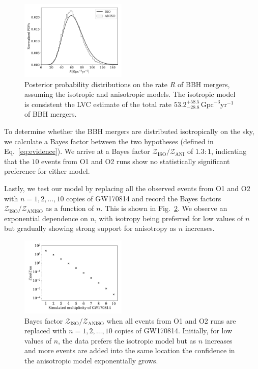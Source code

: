 \documentclass[usenatbib,useAMS]{mnras}
\begin{document}
\begin{figure}
	\centering
	\includegraphics[width=0.45\textwidth]{./figures/rates_histogram.pdf}
    \caption{Posterior probability distributions on the rate $R$ of \ac{BBH} mergers,
	assuming the isotropic and anisotropic models. The isotropic model is
	consistent the LVC estimate of the total rate
	$53.2^{+58.5}_{-28.8}\,\mathrm{Gpc}^{-3}\mathrm{yr}^{-1}$ of \ac{BBH} mergers.}
	\label{fig:totalRateHist}
\end{figure}

To determine whether the \ac{BBH} mergers are distributed
isotropically on the sky, we calculate a Bayes factor between the two
hypotheses (defined in Eq.~\ref{eq:evidence}). We arrive at a Bayes factor
$\mathcal{Z}_{\mathrm{ISO}} / \mathcal{Z}_{\mathrm{ANI}}$ of $1.3:1$, indicating
that the $10$ events from O1 and O2 runs show no statistically significant
preference for either model.

Lastly, we test our model by replacing all the observed events from O1 and O2 with
$n=1, 2, \ldots, 10$ copies of GW170814 and record the Bayes factors
$\mathcal{Z}_{\mathrm{ISO}}/\mathcal{Z}_{\mathrm{ANISO}}$ as a function of $n$. This is
shown in Fig.~\ref{fig:bayes_factors}. We observe an exponential dependence on $n$,
with isotropy being preferred for low values of $n$ but gradually showing strong
support for anisotropy as $n$ increases.

\begin{figure}
	\centering
	\includegraphics[width=0.45\textwidth]{./figures/bayes_factors.pdf}
    \caption{Bayes factor $\mathcal{Z}_{\mathrm{ISO}}/\mathcal{Z}_{\mathrm{ANISO}}$
    when all events
    from O1 and O2 runs are replaced with $n=1, 2, \ldots, 10$ copies of GW170814.
    Initially, for low values of $n$, the data prefers the isotropic model but
    as $n$ increases and more events are added into the same location the
    confidence in the anisotropic model exponentially grows.}
	\label{fig:bayes_factors}
\end{figure}
\end{document}
